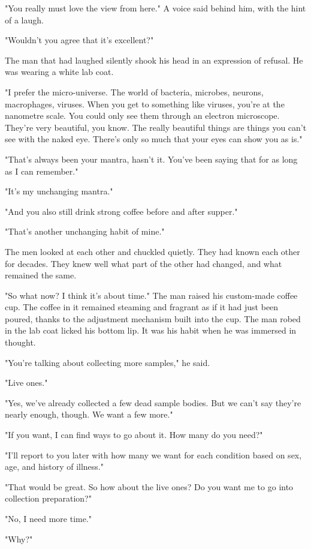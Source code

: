 "You really must love the view from here." A voice said behind him, with
the hint of a laugh.

"Wouldn't you agree that it's excellent?"

The man that had laughed silently shook his head in an expression of
refusal. He was wearing a white lab coat.

"I prefer the micro-universe. The world of bacteria, microbes, neurons,
macrophages, viruses. When you get to something like viruses, you're at
the nanometre scale. You could only see them through an electron
microscope. They're very beautiful, you know. The really beautiful
things are things you can't see with the naked eye. There's only so much
that your eyes can show you as is."

"That's always been your mantra, hasn't it. You've been saying that for
as long as I can remember."

"It's my unchanging mantra."

"And you also still drink strong coffee before and after supper."

"That's another unchanging habit of mine."

The men looked at each other and chuckled quietly. They had known each
other for decades. They knew well what part of the other had changed,
and what remained the same.

"So what now? I think it's about time." The man raised his custom-made
coffee cup. The coffee in it remained steaming and fragrant as if it had
just been poured, thanks to the adjustment mechanism built into the cup.
The man robed in the lab coat licked his bottom lip. It was his habit
when he was immersed in thought.

"You're talking about collecting more samples," he said.

"Live ones."

"Yes, we've already collected a few dead sample bodies. But we can't say
they're nearly enough, though. We want a few more."

"If you want, I can find ways to go about it. How many do you need?"

"I'll report to you later with how many we want for each condition based
on sex, age, and history of illness."

"That would be great. So how about the live ones? Do you want me to go
into collection preparation?"

"No, I need more time."

"Why?"

